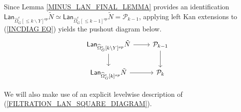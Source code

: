 \documentclass[a4paper,10pt]{article}%
\begin{document}
Since Lemma \ref{MINUS_LAN_FINAL_LEMMA} provides an identification 
$\mathsf{Lan}_{\widehat{\Omega}_{G}^{e}[\leq\! k \mathbin{\backslash} Y]^{op}}\tilde{N} \simeq
\mathsf{Lan}_{\widehat{\Omega}_{G}^{e}[\leq\! k-1]^{op}}\tilde{N} = \mathcal{P}_{k-1}$,
applying left Kan extensions to (\ref{INCDIAG EQ}) yields the pushout diagram below.
\begin{equation}\label{FILTRATION_LAN_SQUARE_DIAGRAM}
\begin{tikzcd}
	\mathsf{Lan}_{\widehat{\Omega}_{G}^e[k \mathbin{\backslash} Y]^{op}}\tilde{N} \arrow[d] \arrow[r] & 
	\P_{k-1} \arrow[d]
\\
	\mathsf{Lan}_{\widehat{\Omega}_{G}^e[k]^{op}}\tilde{N} \arrow[r] &
	\P_k
\end{tikzcd}
\end{equation}

We will also make use of an 
explicit levelwise description of  
(\ref{FILTRATION_LAN_SQUARE_DIAGRAM}).

\end{document}
